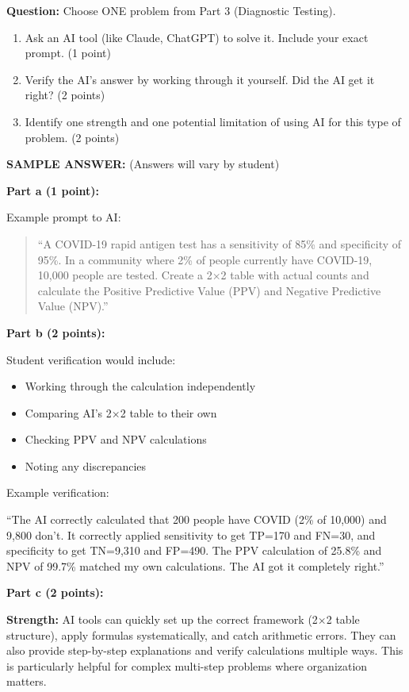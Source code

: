 \documentclass[11pt]{article}
\begin{document}
\textbf{Question:} Choose ONE problem from Part 3 (Diagnostic Testing).

\begin{enumerate}
    \item[a)] Ask an AI tool (like Claude, ChatGPT) to solve it. Include your exact prompt. (1 point)
    \item[b)] Verify the AI's answer by working through it yourself. Did the AI get it right? (2 points)
    \item[c)] Identify one strength and one potential limitation of using AI for this type of problem. (2 points)
\end{enumerate}

\textbf{SAMPLE ANSWER:} (Answers will vary by student)

\textbf{Part a (1 point):}

Example prompt to AI:
\begin{quote}
``A COVID-19 rapid antigen test has a sensitivity of 85\% and specificity of 95\%. In a community where 2\% of people currently have COVID-19, 10,000 people are tested. Create a 2$\times$2 table with actual counts and calculate the Positive Predictive Value (PPV) and Negative Predictive Value (NPV).''
\end{quote}

\textbf{Part b (2 points):}

Student verification would include:
\begin{itemize}
    \item Working through the calculation independently
    \item Comparing AI's 2$\times$2 table to their own
    \item Checking PPV and NPV calculations
    \item Noting any discrepancies
\end{itemize}

Example verification:

``The AI correctly calculated that 200 people have COVID (2\% of 10,000) and 9,800 don't. It correctly applied sensitivity to get TP=170 and FN=30, and specificity to get TN=9,310 and FP=490. The PPV calculation of 25.8\% and NPV of 99.7\% matched my own calculations. The AI got it completely right.''

\textbf{Part c (2 points):}

\textbf{Strength:} AI tools can quickly set up the correct framework (2$\times$2 table structure), apply formulas systematically, and catch arithmetic errors. They can also provide step-by-step explanations and verify calculations multiple ways. This is particularly helpful for complex multi-step problems where organization matters.
\end{document}
